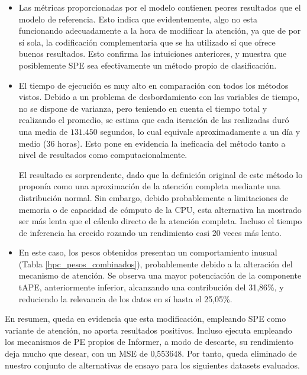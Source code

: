 \begin{itemize}
	\item Las métricas proporcionadas por el modelo contienen peores resultados que el modelo de referencia. Esto indica que evidentemente, algo no esta funcionando adecuadamente a la hora de modificar la atención, ya que de por sí sola, la codificación complementaria que se ha utilizado sí que ofrece buenos resultados. Esto confirma las intuiciones anteriores, y muestra que posiblemente SPE sea efectivamente un método propio de clasificación.
	
	\item El tiempo de ejecución es muy alto en comparación con todos los métodos vistos. Debido a un problema de desbordamiento con las variables de tiempo, no se dispone de varianza, pero teniendo en cuenta el tiempo total y realizando el promedio, se estima que cada iteración de las realizadas duró una media de $131.450$ segundos, lo cual equivale aproximadamente a un día y medio (36 horas). Esto pone en evidencia la ineficacia del método tanto a nivel de resultados como computacionalmente. 
	
	El resultado es sorprendente, dado que la definición original de este método lo proponía como una aproximación de la atención completa mediante una distribución normal. Sin embargo, debido probablemente a limitaciones de memoria o de capacidad de cómputo de la CPU, esta alternativa ha mostrado ser más lenta que el cálculo directo de la atención completa. Incluso el tiempo de inferencia ha crecido rozando un rendimiento casi 20 veces más lento.
	
	\item En este caso, los pesos obtenidos presentan un comportamiento inusual (Tabla \ref{hpc_pesos_combinados}), probablemente debido a la alteración del mecanismo de atención. Se observa una mayor potenciación de la componente tAPE, anteriormente inferior, alcanzando una contribución del 31,86\%, y reduciendo la relevancia de los datos en sí hasta el 25,05\%. 
	
\end{itemize}

En resumen, queda en evidencia que esta modificación, empleando SPE como variante de atención, no aporta resultados positivos. Incluso ejecuta empleando los mecanismos de PE propios de Informer, a modo de descarte, su rendimiento deja mucho que desear, con un MSE de  0,553648. Por tanto, queda eliminado de nuestro conjunto de alternativas de ensayo para los siguientes datasets evaluados.

